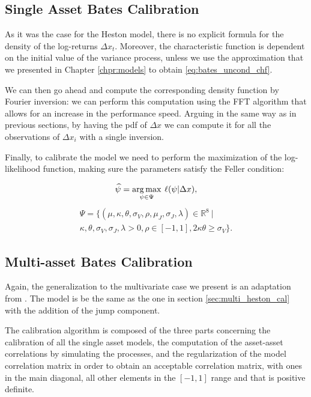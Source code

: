 \subsection{Single Asset Bates Calibration}
As it was the case for the Heston model, there is no explicit formula for the density of the log-returns $\Delta x_t$. Moreover, the characteristic function is dependent on the initial value of the variance process, unless we use the approximation that we presented in Chapter \ref{chpr:models} to obtain \eqref{eq:bates_uncond_chf}.

We can then go ahead and compute the corresponding density function by Fourier inversion: we can perform this computation using the FFT algorithm that allows for an increase in the performance speed. 
Arguing in the same way as in previous sections, by having the pdf of $\Delta x$ we can compute it for all the observations of $\Delta x_i$ with a single inversion.

Finally, to calibrate the model we need to perform the maximization of the log-likelihood function, making sure the parameters satisfy the Feller condition:

\begin{equation}
\widehat{\psi} = \operatorname*{arg\,max}_{\psi \in \Psi} \:\ell(\psi |  \Delta x),
\end{equation}
\begin{multline}
\Psi = \{ (\mu, \kappa, \theta, \sigma_V, \rho, \mu_J, \sigma_J, \lambda) \in \mathbb{R}^8 \: |\: \\
\kappa,\theta,\sigma_V,\sigma_J, \lambda >0, \rho \in [-1,1], 2\kappa\theta \geq \sigma_V \}.
\end{multline}

\subsection{Multi-asset Bates Calibration}
Again, the generalization to the multivariate case we present is an adaptation from \citep{PARSIMONIOUS2011}. The model is be the same as the one in section \ref{sec:multi_heston_cal} with the addition of the jump component.

The calibration algorithm is composed of the three parts concerning the calibration of all the single asset models, the  computation of the asset-asset correlations by simulating the processes, and the regularization of the model correlation matrix in order to obtain an acceptable correlation matrix, with ones in the main diagonal, all other elements in the $[-1,1]$ range and that is positive definite.

